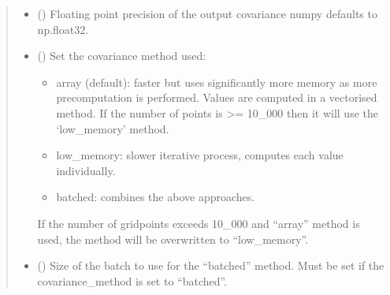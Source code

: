 \documentclass[letterpaper,10pt,english]{sphinxmanual}
\begin{document}
\begin{fulllineitems}
\begin{quote}
\begin{description}
\begin{itemize}
\item {}
\sphinxAtStartPar
{} () \textendash{} Floating point precision of the output covariance numpy defaults to
np.float32.

\item {}
\sphinxAtStartPar
{} () \textendash{}
\sphinxAtStartPar
Set the covariance method used:
\begin{itemize}
\item {}
\sphinxAtStartPar
array (default): faster but uses significantly more memory as
more pre\sphinxhyphen{}computation is performed. Values are computed in a
vectorised method. If the number of points is \textgreater{}= 10\_000 then it will
use the ‘low\_memory’ method.

\item {}
\sphinxAtStartPar
low\_memory: slower iterative process, computes each value
individually.

\item {}
\sphinxAtStartPar
batched: combines the above approaches.

\end{itemize}

\sphinxAtStartPar
If the number of grid\sphinxhyphen{}points exceeds 10\_000 and “array” method is used,
the method will be overwritten to “low\_memory”.


\item {}
\sphinxAtStartPar
{} () \textendash{} Size of the batch to use for the “batched” method. Must be set if the
covariance\_method is set to “batched”.

\end{itemize}

\end{description}\end{quote}


\end{fulllineitems}
\end{document}
